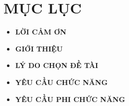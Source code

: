 \documentclass[a4paper,12pt]{article}
\begin{document}


\newpage

\section*{MỤC LỤC}
\begin{itemize}
		\item \textbf{LỜI CẢM ƠN} \dotfill \pageref{sec:thanks}
    \item \textbf{GIỚI THIỆU} \dotfill \pageref{sec:introduction}
    \item \textbf{LÝ DO CHỌN ĐỀ TÀI} \dotfill \pageref{sec:reason}
    \item \textbf{YÊU CẦU CHỨC NĂNG} \dotfill \pageref{sec:functional-requirements}
    \item \textbf{YÊU CẦU PHI CHỨC NĂNG} \dotfill \pageref{sec:non-functional-requirements}
\end{itemize}

\newpage

\label{sec:thanks}

\label{sec:introduction}

\label{sec:reason}

\label{sec:functional-requirements} 

\label{sec:non-functional-requirements}
\end{document}
